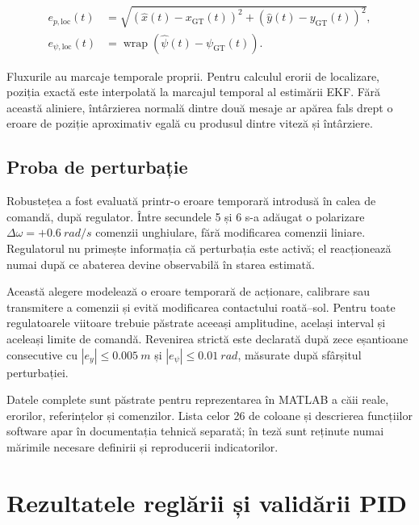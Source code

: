 \documentclass[12pt,a4paper,oneside]{report}
\begin{document}
\begin{align}
  e_{p,\mathrm{loc}}(t) &=
  \sqrt{\left(\hat{x}(t)-x_{\mathrm{GT}}(t)\right)^2+
  \left(\hat{y}(t)-y_{\mathrm{GT}}(t)\right)^2}, \\
  e_{\psi,\mathrm{loc}}(t) &=
  \operatorname{wrap}\left(\hat{\psi}(t)-\psi_{\mathrm{GT}}(t)\right).
\end{align}

Fluxurile au marcaje temporale proprii. Pentru calculul erorii de localizare,
poziția exactă este interpolată la marcajul temporal al estimării EKF. Fără
această aliniere, întârzierea normală dintre două mesaje ar apărea fals drept o
eroare de poziție aproximativ egală cu produsul dintre viteză și întârziere.

\section{Proba de perturbație}

Robustețea a fost evaluată printr-o eroare temporară introdusă în calea de
comandă, după regulator. Între secundele 5 și 6 s-a adăugat o polarizare
$\Delta\omega=+\SI{0.6}{rad/s}$ comenzii unghiulare, fără modificarea comenzii
liniare. Regulatorul nu primește informația că perturbația este activă; el
reacționează numai după ce abaterea devine observabilă în starea estimată.

Această alegere modelează o eroare temporară de acționare, calibrare sau
transmitere a comenzii și evită modificarea contactului roată--sol. Pentru toate
regulatoarele viitoare trebuie păstrate aceeași amplitudine, același interval și
aceleași limite de comandă. Revenirea strictă este declarată după zece
eșantioane consecutive cu $|e_y|\leq\SI{0.005}{m}$ și
$|e_\psi|\leq\SI{0.01}{rad}$, măsurate după sfârșitul perturbației.

Datele complete sunt păstrate pentru reprezentarea în MATLAB a căii reale,
erorilor, referințelor și comenzilor. Lista celor 26 de coloane și descrierea
funcțiilor software apar în documentația tehnică separată; în teză sunt reținute
numai mărimile necesare definirii și reproducerii indicatorilor.

\chapter{Rezultatele reglării și validării PID}
\end{document}
